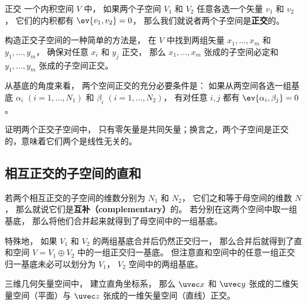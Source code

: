 
\begin{issues}
\issueTODO
\end{issues}



\begin{definition}{正交}
一个内积空间 $V$ 中， 如果两个子空间 $V_1$ 和 $V_2$ 任意各选一个矢量 ${v_1}$ 和 ${v_2}$， 它们的内积都有 $\ev{v_1, v_2} = 0$， 那么我们就说者两个子空间是\textbf{正交}的。
\end{definition}

构造正交子空间的一种简单的方法是， 在 $V$ 中找到两组矢量 $x_1, \dots, x_m$ 和 $y_1, \dots, y_m$， 确保对任意 $x_i$ 和 $y_j$ 正交， 那么 $x_1, \dots, x_m$ 张成的子空间必定和 $y_1, \dots, y_m$ 张成的子空间正交。

\begin{theorem}{}
从基底的角度来看， 两个空间正交的充分必要条件是： 如果从两空间各选一组基底 ${\alpha_i}$ $(i = 1, \dots, N_1)$ 和 ${\beta_i}$ $(i = 1, \dots, N_2)$， 有对任意 $i, j$ 都有 $\ev{\alpha_i, \beta_j} = 0$。
\end{theorem}

\begin{exercise}{}
证明两个正交子空间中， 只有零矢量是共同矢量；换言之，两个子空间是正交的，意味着它们两个是线性无关的。
\end{exercise}

\subsection{相互正交的子空间的直和}

若两个相互正交的子空间的维数分别为 $N_1$ 和 $N_2$， 它们之和等于母空间的维数 $N$， 那么就说它们是\textbf{互补（complementary）}的。 若分别在这两个空间中取一组基底， 那么将他们合并起来就得到了母空间中的一组基底。

特殊地， 如果 $V_1$ 和 $V_2$ 的两组基底合并后仍然正交归一， 那么合并后就得到了直和空间 $V = V_1 \oplus V_2$ 中的一组正交归一基底。 但注意直和空间中的任意一组正交归一基底未必可以划分为 $V_1$， $V_2$ 空间中的两组基底。

\begin{example}{}
三维几何矢量空间中， 建立直角坐标系， 那么 $\uvec x$ 和 $\uvec y$ 张成的二维矢量空间（平面）与 $\uvec z$ 张成的一维矢量空间（直线）正交。
\end{example}

